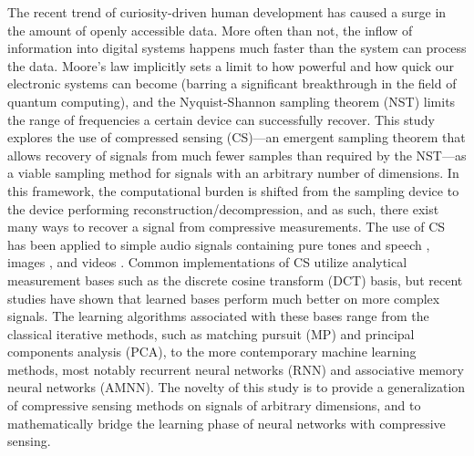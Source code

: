 The recent trend of curiosity-driven human development has caused a surge in the amount of openly accessible data. More often than not, the inflow of information into digital systems happens much faster than the system can process the data. Moore's law implicitly sets a limit to how powerful and how quick our electronic systems can become (barring a significant breakthrough in the field of quantum computing), and the Nyquist-Shannon sampling theorem (NST) limits the range of frequencies a certain device can successfully recover. This study explores the use of compressed sensing (CS)---an emergent sampling theorem that allows recovery of signals from much fewer samples than required by the NST---as a viable sampling method for signals with an arbitrary number of dimensions. In this framework, the computational burden is shifted from the sampling device to the device performing reconstruction/decompression, and as such, there exist many ways to recover a signal from compressive measurements. The use of CS has been applied to simple audio signals containing pure tones \cite{Mathew2016,Andras2018} and speech \cite{Low2013,Low2018,Abrol2015}, images \cite{Mo2013,Zhou2016,Romero2016}, and videos \cite{Liu2014,Chen2014}. Common implementations of CS utilize analytical measurement bases such as the discrete cosine transform (DCT) basis, but recent studies \cite{Liu2013,Sharma2018,Eslahi2016} have shown that learned bases perform much better on more complex signals. The learning algorithms associated with these bases range from the classical iterative methods, such as matching pursuit (MP) and principal components analysis (PCA), to the more contemporary machine learning methods, most notably recurrent neural networks (RNN) and associative memory neural networks (AMNN). The novelty of this study is to provide a generalization of compressive sensing methods on signals of arbitrary dimensions, and to mathematically bridge the learning phase of neural networks with compressive sensing.



